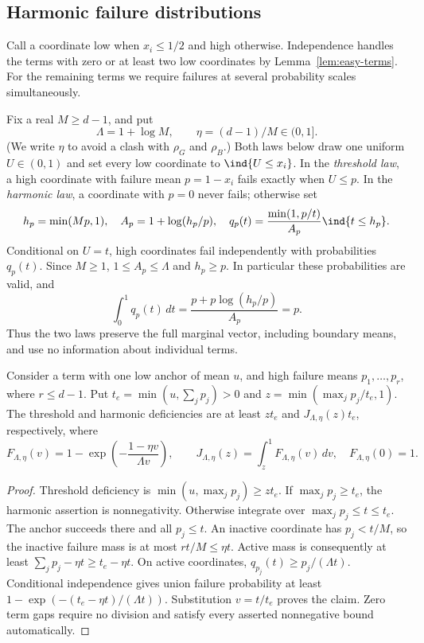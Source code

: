 \subsection{Harmonic failure distributions}
Call a coordinate low when $x_i\le1/2$ and high otherwise. Independence
handles the terms with zero or at least two low coordinates by
Lemma~\ref{lem:easy-terms}. For the remaining terms we require failures
at several probability scales simultaneously.

Fix a real $M\ge d-1$, and put
\begin{equation}\label{eq:harmonic-parameters}
 \Lambda=1+\log M,\qquad \eta=(d-1)/M\in(0,1].
\end{equation}
(We write $\eta$ to avoid a clash with $\rho_G$ and $\rho_B$.) Both laws
below draw one uniform
$U\in(0,1)$ and set every low coordinate to $\ind\{U\le x_i\}$.
In the \emph{threshold law}, a high coordinate with failure mean
$p=1-x_i$ fails exactly when $U\le p$. In the \emph{harmonic law}, a
coordinate with $p=0$ never fails; otherwise set
\begin{equation}\label{eq:harmonic-law}
 h_p=\min(Mp,1),\quad A_p=1+\log(h_p/p),\quad
 q_p(t)=\frac{\min(1,p/t)}{A_p}\ind\{t\le h_p\}.
\end{equation}
Conditional on $U=t$, high coordinates fail independently with
probabilities $q_p(t)$. Since $M\ge1$, $1\le A_p\le\Lambda$ and
$h_p\ge p$. In particular these probabilities are valid, and
\[
 \int_0^1q_p(t)\,dt
 =\frac{p+p\log(h_p/p)}{A_p}=p.
\]
Thus the two laws preserve the full marginal vector, including boundary
means, and use no information about individual terms.

\begin{lemma}\label{lem:harmonic-curve}
Consider a term with one low anchor of mean $u$, and high failure means
$p_1,\ldots,p_r$, where $r\le d-1$. Put
$t_e=\min(u,\sum_jp_j)>0$ and $z=\min(\max_jp_j/t_e,1)$. The threshold
and harmonic deficiencies are at least $zt_e$ and $J_{\Lambda,\eta}(z)t_e$,
respectively, where
\begin{equation}\label{eq:harmonic-integral}
 F_{\Lambda,\eta}(v)=1-\exp\left(-\frac{1-\eta v}{\Lambda v}\right),
 \qquad J_{\Lambda,\eta}(z)=\int_z^1 F_{\Lambda,\eta}(v)\,dv,
 \quad F_{\Lambda,\eta}(0)=1.
\end{equation}
\end{lemma}
\begin{proof}
Threshold deficiency is $\min(u,\max_jp_j)\ge zt_e$. If
$\max_jp_j\ge t_e$, the harmonic assertion is nonnegativity. Otherwise
integrate over $\max_jp_j\le t\le t_e$. The anchor succeeds there and
all $p_j\le t$. An inactive coordinate has $p_j<t/M$, so the inactive
failure mass is at most $rt/M\le\eta t$. Active mass is consequently at
least $\sum_jp_j-\eta t\ge t_e-\eta t$. On active coordinates,
$q_{p_j}(t)\ge p_j/(\Lambda t)$. Conditional independence gives union
failure probability at least
$1-\exp(-(t_e-\eta t)/(\Lambda t))$. Substitution $v=t/t_e$ proves the
claim. Zero term gaps require no division and satisfy every asserted
nonnegative bound automatically.
\end{proof}


